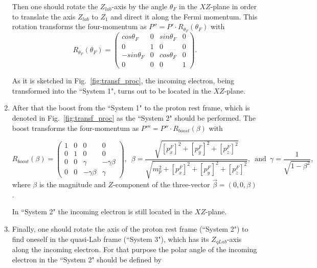 \begin{enumerate}
Then one should rotate the $Z_{lab}$-axis by the angle $\theta_{F}$ in the $XZ$-plane in order to translate the axis $Z_{lab}$ to $Z_{1}$ and direct it along the Fermi momentum. This rotation transforms the four-momentum as $P'' = P' \cdot R_{\theta_{F}}(\theta_{F})$ with
\begin{equation}\label{eq:rot_th_f}
R_{\theta_{F}}(\theta_{F})=\begin{pmatrix}
cos\theta_{F} &0  &sin\theta_{F}  &0 \\ 
 0& 1 & 0 &0 \\ 
 -sin\theta_{F} &0  &cos\theta_{F}  & 0\\ 
0 &0  & 0 &1 
\end{pmatrix}.
\end{equation}

As it is sketched in Fig.~\ref{fig:transf_proc}, the incoming electron, being transformed into the ``System 1", turns out to be located in the $XZ$-plane.

\item After that the boost from the ``System 1" to the proton rest frame, which is denoted in Fig.~\ref{fig:transf_proc} as the ``System 2" should be performed. The boost transforms the four-momentum as $P''' = P'' \cdot R_{boost}(\beta)$ with

\begin{equation}\label{eq:boost}
R_{boost}(\beta) = \begin{pmatrix}
1 &0  &0  &0 \\ 
0 &1  &0  &0 \\ 
 0&  0& \gamma  &-\gamma \beta  \\ 
 0&  0& -\gamma \beta  & \gamma 
\end{pmatrix}, \, \, \, \beta =\frac{\sqrt{[p_{x}^{F}]^{2}+[p_{y}^{F}]^{2}+[p_{z}^{F}]^{2}}}{\sqrt{m_{p}^{2}+[p_{x}^{F}]^{2}+[p_{y}^{F}]^{2}+[p_{z}^{F}]^{2}}}, \, \, \,  \textrm{and} \,\,\,   \gamma =\frac{1}{\sqrt{1-\beta ^{2}}},
\end{equation}
where $\beta$ is the magnitude and $Z$-component of the three-vector $\overrightarrow{\beta}=(0,0,\beta)$.

In ``System 2" the incoming electron is still located in the $XZ$-plane.



\item Finally, one should rotate the axis of the proton rest frame (``System 2") to find oneself in the quasi-Lab frame (``System 3"), which has its $Z_{qLab}$-axis along the incoming electron. For that purpose the polar angle of the incoming electron in the ``System 2" should be defined by


\end{enumerate}
